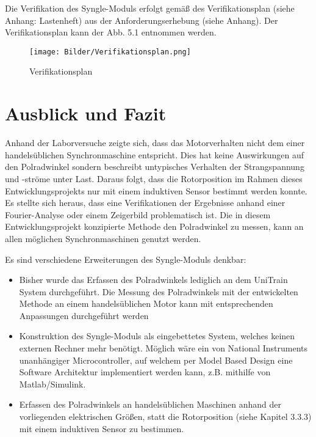 Die Verifikation des Syngle-Moduls erfolgt gemäß des Verifikationsplan (siehe Anhang:
Lastenheft) aus der Anforderungserhebung (siehe Anhang). Der Verifikationsplan kann der Abb. 5.1 entnommen werden.

\begin{figure}[H]
	\centering
	\texttt{[image: Bilder/Verifikationsplan.png]} 
	\caption{Verifikationsplan}
	\label{fig:Verlängerung der Welle mit Bremskegel}
\end{figure}

\chapter{Ausblick und Fazit}
\label{chap:Ausblick und Fazit}

Anhand der Laborversuche zeigte sich, dass das Motorverhalten nicht dem einer handelsüblichen Synchronmaschine entspricht. Dies hat keine Auswirkungen auf den Polradwinkel sondern beschreibt untypisches Verhalten der Strangspannung und -ströme unter Last. Daraus folgt, dass die Rotorposition im Rahmen dieses Entwicklungsprojekts nur mit einem induktiven Sensor bestimmt werden konnte. Es stellte sich heraus, dass eine Verifikationen der Ergebnisse anhand einer Fourier-Analyse oder einem Zeigerbild problematisch ist. Die in diesem Entwicklungsprojekt konzipierte Methode den Polradwinkel zu messen, kann an allen möglichen Synchronmaschinen genutzt werden.

Es sind verschiedene Erweiterungen des Syngle-Moduls denkbar:

	\begin{itemize}
	\item Bisher wurde das Erfassen des Polradwinkels lediglich an dem UniTrain System durchgeführt. Die Messung des Polradwinkels mit der entwickelten Methode an einem handelsüblichen Motor kann mit entsprechenden Anpassungen durchgeführt werden
	\item Konstruktion des Syngle-Moduls als eingebettetes System, welches keinen externen Rechner mehr benötigt. Möglich wäre ein von National Instruments unanhängiger Microcontroller, auf welchem per Model Based Design eine Software Architektur implementiert werden kann, z.B. mithilfe von Matlab/Simulink.
	\item Erfassen des Polradwinkels an handelsüblichen Maschinen anhand der vorliegenden elektrischen Größen, statt die Rotorposition (siehe Kapitel 3.3.3) mit einem induktiven Sensor zu bestimmen.
\end{itemize}


